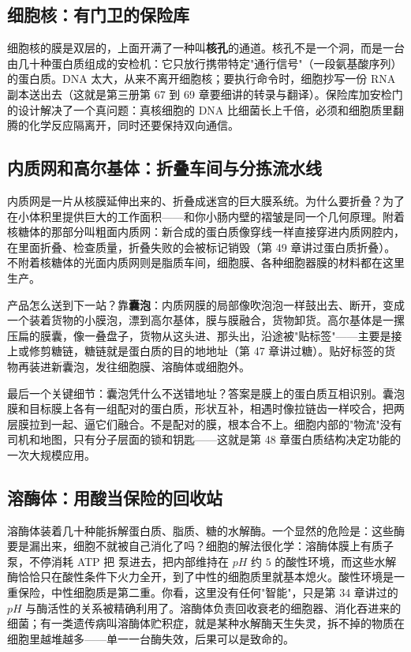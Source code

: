\subsection{细胞核：有门卫的保险库}

细胞核的膜是双层的，上面开满了一种叫\textbf{核孔}的通道。核孔不是一个洞，而是一台由几十种蛋白质组成的安检机：它只放行携带特定"通行信号"（一段氨基酸序列）的蛋白质。DNA 太大，从来不离开细胞核；要执行命令时，细胞抄写一份 RNA 副本送出去（这就是第三册第 67 到 69 章要细讲的转录与翻译）。保险库加安检门的设计解决了一个真问题：真核细胞的 DNA 比细菌长上千倍，必须和细胞质里翻腾的化学反应隔离开，同时还要保持双向通信。

\subsection{内质网和高尔基体：折叠车间与分拣流水线}

内质网是一片从核膜延伸出来的、折叠成迷宫的巨大膜系统。为什么要折叠？为了在小体积里提供巨大的工作面积——和你小肠内壁的褶皱是同一个几何原理。附着核糖体的那部分叫粗面内质网：新合成的蛋白质像穿线一样直接穿进内质网腔内，在里面折叠、检查质量，折叠失败的会被标记销毁（第 49 章讲过蛋白质折叠）。不附着核糖体的光面内质网则是脂质车间，细胞膜、各种细胞器膜的材料都在这里生产。

产品怎么送到下一站？靠\textbf{囊泡}：内质网膜的局部像吹泡泡一样鼓出去、断开，变成一个装着货物的小膜泡，漂到高尔基体，膜与膜融合，货物卸货。高尔基体是一摞压扁的膜囊，像一叠盘子，货物从这头进、那头出，沿途被"贴标签"——主要是接上或修剪糖链，糖链就是蛋白质的目的地地址（第 47 章讲过糖）。贴好标签的货物再装进新囊泡，发往细胞膜、溶酶体或细胞外。

最后一个关键细节：囊泡凭什么不送错地址？答案是膜上的蛋白质互相识别。囊泡膜和目标膜上各有一组配对的蛋白质，形状互补，相遇时像拉链齿一样咬合，把两层膜拉到一起、逼它们融合。不是配对的膜，根本合不上。细胞内部的"物流"没有司机和地图，只有分子层面的锁和钥匙——这就是第 48 章蛋白质结构决定功能的一次大规模应用。

\subsection{溶酶体：用酸当保险的回收站}

溶酶体装着几十种能拆解蛋白质、脂质、糖的水解酶。一个显然的危险是：这些酶要是漏出来，细胞不就被自己消化了吗？细胞的解法很化学：溶酶体膜上有质子泵，不停消耗 ATP 把  泵进去，把内部维持在 $pH$ 约 $5$ 的酸性环境，而这些水解酶恰恰只在酸性条件下火力全开，到了中性的细胞质里就基本熄火。酸性环境是一重保险，中性细胞质是第二重。你看，这里没有任何"智能"，只是第 34 章讲过的 $pH$ 与酶活性的关系被精确利用了。溶酶体负责回收衰老的细胞器、消化吞进来的细菌；有一类遗传病叫溶酶体贮积症，就是某种水解酶天生失灵，拆不掉的物质在细胞里越堆越多——单一一台酶失效，后果可以是致命的。

